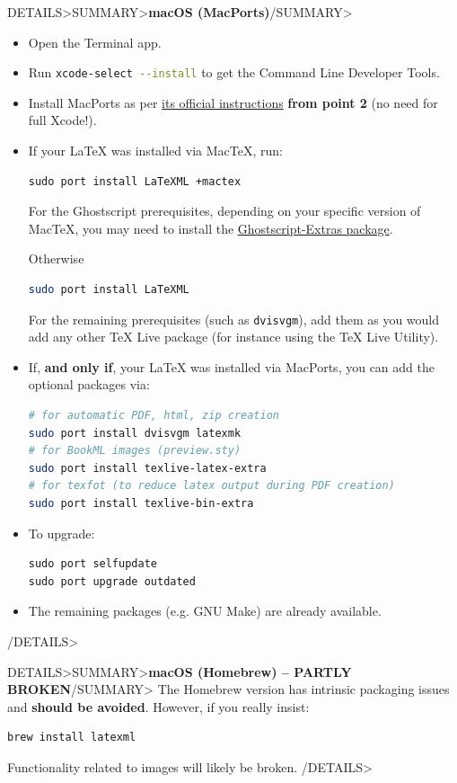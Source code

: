 \documentclass[a4paper,british]{article}
\newenvironment{foldedframe}[1][]{%
    \<DETAILS>\<SUMMARY>\textbf{#1}\</SUMMARY>}%
  {\</DETAILS>}
\newenvironment{foldedframe}[1][]{\bgroup\colorlet{TFFrameColor}{SpringGreen}
  \colorlet{TFTitleColor}{black}\begin{titled-frame}{#1}}{\end{titled-frame}\egroup}
\def\cmdinline{\lstinline[language=bash,frame=none]}
\begin{document}
\begin{foldedframe}[macOS (MacPorts)]
  \begin{itemize}
    \item Open the Terminal app.
    \item Run \cmdinline|xcode-select --install| to get the Command Line Developer Tools.
    \item Install MacPorts as per \href{https://www.macports.org/install.php}{its official instructions} \textbf{from point 2} (no need for full Xcode!).
    \item If your \LaTeX{} was installed via Mac\TeX{}, run:
          \begin{lstlisting}
sudo port install LaTeXML +mactex
        \end{lstlisting}
        For the Ghostscript prerequisites, depending on your specific version of Mac\TeX{}, you may need to install the \href{https://tug.org/mactex/morepackages.html}{Ghostscript-Extras package}.

          Otherwise
          \begin{lstlisting}[language=bash]
sudo port install LaTeXML
        \end{lstlisting}

      For the remaining prerequisites (such as \texttt{dvisvgm}), add them as you would add any other \TeX{} Live package (for instance using the \TeX{} Live Utility).
    \item If, \textbf{and only if}, your \LaTeX{} was installed via MacPorts, you can add the optional packages via:
          \begin{lstlisting}[language=bash]
# for automatic PDF, html, zip creation
sudo port install dvisvgm latexmk
# for BookML images (preview.sty)
sudo port install texlive-latex-extra
# for texfot (to reduce latex output during PDF creation)
sudo port install texlive-bin-extra
          \end{lstlisting}
    \item To upgrade:
          \begin{lstlisting}
sudo port selfupdate
sudo port upgrade outdated
        \end{lstlisting}
    \item The remaining packages (e.g. GNU Make) are already available.
  \end{itemize}
\end{foldedframe}

\begin{foldedframe}[macOS (Homebrew) -- PARTLY BROKEN]
  The Homebrew version has intrinsic packaging issues and \textbf{should be avoided}. However, if you really insist:
  \begin{lstlisting}
brew install latexml
    \end{lstlisting}
  Functionality related to images will likely be broken.
\end{foldedframe}
\end{document}
